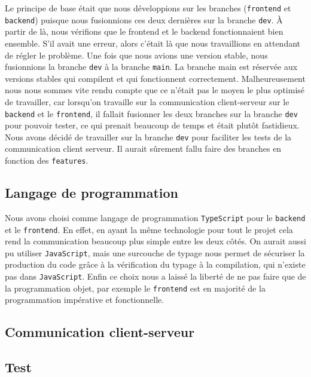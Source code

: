 Le principe de base était que nous développions sur les branches (\lstinline{frontend} et \lstinline{backend}) puisque nous fusionnions ces deux dernières sur la branche \lstinline{dev}. À partir de là, nous vérifions que le frontend et le backend fonctionnaient bien ensemble. S'il avait une erreur, alors c'était là que nous travaillions en attendant de régler le problème. Une fois que nous avions une version stable, nous fusionnions la branche \lstinline{dev} à la branche \lstinline{main}. La branche main est réservée aux versions stables qui compilent et qui fonctionnent correctement. Malheureusement nous nous sommes vite rendu compte que ce n'était pas le moyen le plus optimisé de travailler, car lorsqu'on travaille sur la communication client-serveur sur le \lstinline{backend} et le \lstinline{frontend}, il fallait fusionner les deux branches sur la branche \lstinline{dev} pour pouvoir tester, ce qui prenait beaucoup de temps et était plutôt fastidieux. Nous avons décidé de travailler sur la branche \lstinline{dev} pour faciliter les tests de la communication client serveur. Il aurait sûrement fallu faire des branches en fonction des {\tt features}.

\subsection{Langage de programmation}

Nous avons choisi comme langage de programmation \lstinline{TypeScript} pour le \lstinline{backend} et le \lstinline{frontend}. En effet, en ayant la même technologie pour tout le projet cela rend la communication beaucoup plus simple entre les deux côtés. On aurait aussi pu utiliser \lstinline{JavaScript}, mais une surcouche de typage nous permet de sécuriser la production du code grâce à la vérification du typage à la compilation, qui n'existe pas dans \lstinline{JavaScript}. Enfin ce choix nous a laissé la liberté de ne pas faire que de la programmation objet, par exemple le \lstinline{frontend} est en majorité de la programmation impérative et fonctionnelle.

\subsection{Communication client-serveur}



\subsection{Test}

